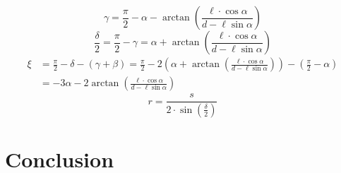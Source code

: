 \documentclass[abstract,toc,los,english,10pt,glossary,acronyms]{jluthesis}
\begin{document}
\begin{equation}
	\gamma = \frac{\pi}{2} - \alpha - \arctan\left(\frac{\ell\cdot\cos\alpha}{d - \ell\sin\alpha}\right)
\end{equation}
\begin{equation}
	\frac{\delta}{2} = \frac{\pi}{2} - \gamma = \alpha + \arctan\left(\frac{\ell\cdot\cos\alpha}{d - \ell\sin\alpha}\right)
\end{equation}
\begin{equation}
	\begin{aligned}
	\xi &= \frac{\pi}{2} - \delta - \left(\gamma + \beta\right) = \frac{\pi}{2} - 2\left(\alpha + \arctan\left(\frac{\ell\cdot\cos\alpha}{d - \ell\sin\alpha}\right)\right) - \left(\frac{\pi}{2} - \alpha\right) \\
	&= -3\alpha - 2\arctan\left(\frac{\ell\cdot\cos\alpha}{d - \ell\sin\alpha}\right)
\end{aligned}
\end{equation}
\begin{equation}
	r = \frac{s}{2\cdot\sin\left(\frac{\delta}{2}\right)}
\end{equation}
\clearpage
\section{Conclusion}
\clearpage

\makeback
\end{document}
